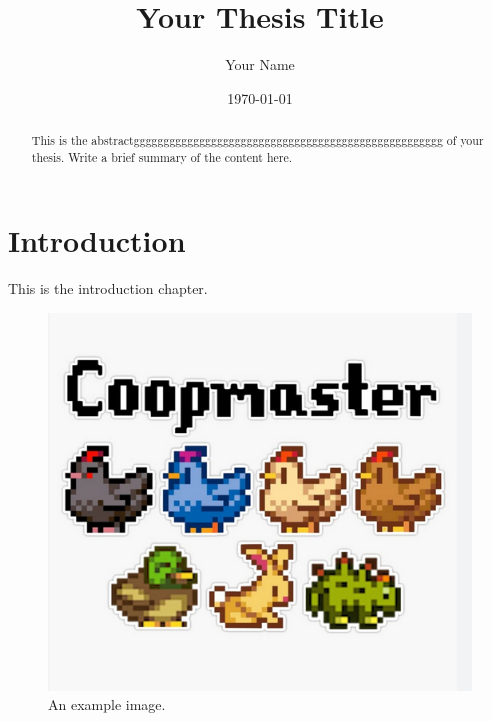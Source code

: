 \documentclass{article}
\begin{document}
    \title{Your Thesis Title}
    \author{Your Name}
    \date{\today}
    \maketitle

    \begin{abstract}
        This is the abstractgggggggggggggggggggggggggggggggggggggggggggggggggggg of your thesis. Write a brief summary of the content here.
    \end{abstract}

    \tableofcontents

    \printindex


    \chapter{Introduction}
    \label{chap:introduction}
    This is the introduction chapter.

    \begin{figure}[h!]
        \centering
        \includegraphics{./images/coopmaster}
        \caption{An example image.}
        \label{fig:example}
    \end{figure}
\end{document}
